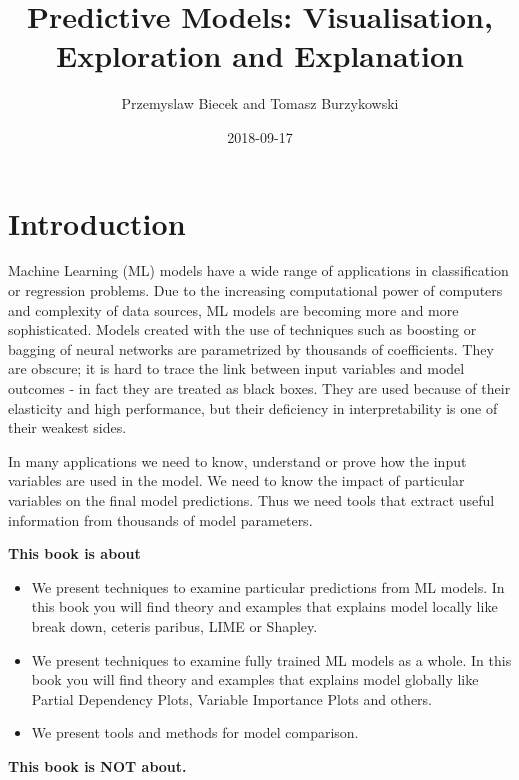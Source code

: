 \documentclass[]{book}
\title{Predictive Models: Visualisation, Exploration and Explanation}
\author{Przemyslaw Biecek and Tomasz Burzykowski}
\date{2018-09-17}
\providecommand{\tightlist}{%
  \setlength{\itemsep}{0pt}\setlength{\parskip}{0pt}}
\theoremstyle{definition}
\theoremstyle{definition}
\theoremstyle{definition}
\theoremstyle{remark}
\begin{document}
\maketitle

{
\setcounter{tocdepth}{1}
\tableofcontents
}
\hypertarget{introduction}{%
\chapter{Introduction}\label{introduction}}

Machine Learning (ML) models have a wide range of applications in
classification or regression problems. Due to the increasing
computational power of computers and complexity of data sources, ML
models are becoming more and more sophisticated. Models created with the
use of techniques such as boosting or bagging of neural networks are
parametrized by thousands of coefficients. They are obscure; it is hard
to trace the link between input variables and model outcomes - in fact
they are treated as black boxes. They are used because of their
elasticity and high performance, but their deficiency in
interpretability is one of their weakest sides.

In many applications we need to know, understand or prove how the input
variables are used in the model. We need to know the impact of
particular variables on the final model predictions. Thus we need tools
that extract useful information from thousands of model parameters.

\textbf{This book is about}

\begin{itemize}
\tightlist
\item
  We present techniques to examine particular predictions from ML
  models. In this book you will find theory and examples that explains
  model locally like break down, ceteris paribus, LIME or Shapley.
\item
  We present techniques to examine fully trained ML models as a whole.
  In this book you will find theory and examples that explains model
  globally like Partial Dependency Plots, Variable Importance Plots and
  others.
\item
  We present tools and methods for model comparison.
\end{itemize}

\textbf{This book is NOT about.}
\end{document}
